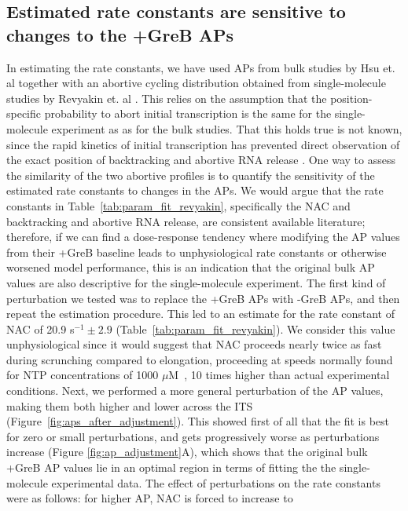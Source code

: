 \subsection{Estimated rate constants are sensitive to changes to the +GreB 
APs}
In estimating the rate constants, we have used APs from bulk studies by Hsu
et. al \cite{hsu_initial_2006} together with an abortive cycling distribution
obtained from single-molecule studies by Revyakin et. al
\cite{revyakin_abortive_2006}. This relies on the assumption that the
position-specific probability to abort initial transcription is the same for
the single-molecule experiment as as for the bulk studies. That this holds
true is not known, since the rapid kinetics of initial transcription
has prevented direct observation of the exact position of backtracking and abortive
RNA release \cite{margeat_direct_2006, revyakin_abortive_2006}. One way to
assess the similarity of the two abortive profiles is to quantify the
sensitivity of the estimated rate constants to changes in the APs. We would
argue that the rate constants in Table~\ref{tab:param_fit_revyakin},
specifically the NAC and backtracking and abortive RNA release, are consistent
available literature; therefore, if we can find a dose-response tendency
where modifying the AP values from their +GreB baseline leads to
unphysiological rate constants or otherwise worsened model performance, this
is an indication that the original bulk AP values are also descriptive for the
single-molecule experiment. The first kind of perturbation we tested was to
replace the +GreB APs with -GreB APs, and then repeat the estimation
procedure. This led to an estimate for the rate constant of NAC of 20.9
s$^{-1} \pm 2.9$ (Table~\ref{tab:param_fit_revyakin}). We consider this value
unphysiological since it would suggest that NAC proceeds nearly twice as fast during
scrunching compared to elongation, proceeding at speeds normally found for NTP
concentrations of 1000 $\mu$M~\cite{bai_mechanochemical_2007}, 10 times higher
than actual experimental conditions. Next, we performed a more general
perturbation of the AP values, making them both higher and lower across the
ITS (Figure~\ref{fig:aps_after_adjustment}). This showed first of all that the fit is
best for zero or small perturbations, and gets progressively worse as
perturbations increase (Figure \ref{fig:ap_adjustment}A), which shows that the
original bulk +GreB AP values lie in an optimal region in terms of fitting the
the single-molecule experimental data. The effect of perturbations on the rate
constants were as follows: for higher AP, NAC is forced to increase to
